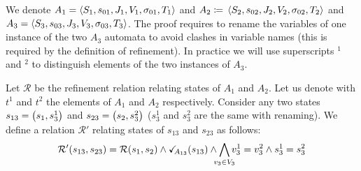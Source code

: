 \documentclass[runningheads]{llncs}
\begin{document}
We denote $A_1=  \left<S_1,s_{01},J_1,V_1,\sigma_{01},T_1\right>$ and \(A_2 \defobject \OA{S_2}{s_{02}}{J_2}{V_2}{\sigma_{02}}{T_2}\) and $A_3 = \left<S_3,s_{03},J_3,V_3,\sigma_{03},T_3\right>$. The proof requires  to rename the variables of one instance of the two $A_3$ automata to avoid clashes in variable names (this is required by the definition of refinement). In practice we will use superscripts ${}^1$ and ${}^2$ to distinguish elements of the two instances of $A_3$.

Let $\mathcal{R}$ be the refinement relation relating states of $A_1$ and $A_2$. 
Let us denote with $t^1$ and $t^2$  the elements of $A_1$ and $A_2$ respectively.
Consider any two states $s_{13} = {\left(s_1,s^1_3\right)}$ and $s_{23} = {\left(s_2,s^2_3\right)}$ ($s^1_3$ and $s^2_3$  are the same with renaming). We define a relation $\mathcal{R}'$ relating states of $s_{13}$ and $s_{23}$ as follows:
\[ \mathcal{R}' \mpar{s_{13}, s_{23}} = \mathcal{R}\mpar{s_{1}, s_{2}} \land \reach{A_{13}}(s_{13})  %
 \wedge \bigwedge_\subbox{v_3\in V_3}
 v^1_3=v^2_3\land s^1_3 = s^2_3\]

\end{document}
